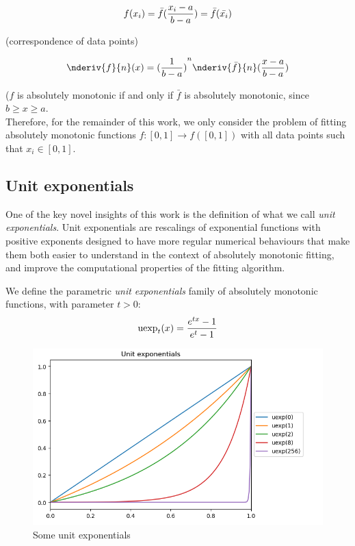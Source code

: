 \documentclass[12pt,a4paper]{article}
\newcommand{\uexp}[1] {{\text{uexp}_{#1}}}
\begin{document}
\begin{equation}
{f(x_i)} = \bar{f}({{x_i - a} \over {b-a}}) = \bar{f}(\bar{x_i})\\
\end{equation}

\noindent (correspondence of data points)

\begin{equation}
\nderiv{f}{n}(x) = {({{1} \over {b - a}})}^n {\nderiv{\bar{f}}{n}} ({{x -a} \over {b-a}})\\
\end{equation}

\noindent ($f$ is absolutely monotonic if and only if $\bar{f}$ is absolutely monotonic, since $b \geq x \geq a$.\\

Therefore, for the remainder of this work, we only consider the problem of fitting absolutely monotonic functions $f: [0,1] \rightarrow f([0,1])$ with all data points such that $x_i \in [0,1]$.

\subsection{Unit exponentials}

One of the key novel insights of this work is the definition of what we call {\emph{unit exponentials}}. Unit exponentials are rescalings of exponential functions with positive exponents designed to have more regular numerical behaviours that make them both easier to understand in the context of absolutely monotonic fitting, and improve the computational properties of the fitting algorithm.\\

\begin{definition}
We define the parametric {\emph{unit exponentials}} family of absolutely monotonic functions, with parameter $t > 0$:
\begin{equation}
\uexp{t}(x) = {{e^{tx} - 1} \over {e^t - 1}}
\end{equation}
\end{definition}

\begin{figure}
\caption{\label{fig_unit_exponentials}Some unit exponentials}
\centering
\includegraphics[width=\textwidth]{unit_exponentials.png}
\end{figure}
\end{document}
